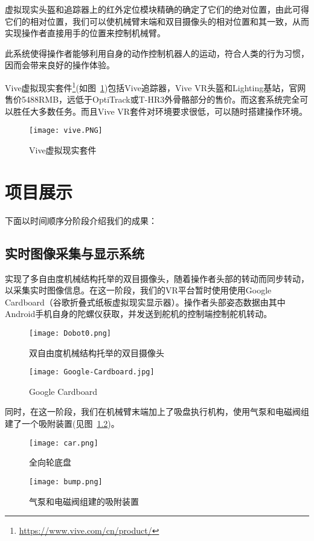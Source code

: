 虚拟现实头盔和追踪器上的红外定位模块精确的确定了它们的绝对位置，由此可得它们的相对位置，我们可以使机械臂末端和双目摄像头的相对位置和其一致，从而实现操作者直接用手的位置来控制机械臂。

此系统使得操作者能够利用自身的动作控制机器人的运动，符合人类的行为习惯，因而会带来良好的操作体验。

Vive虚拟现实套件\footnote{\url{https://www.vive.com/cn/product/}}(如图~\ref{vivekit})包括Vive追踪器，Vive VR头盔和Lighting基站，官网售价5488RMB，远低于OptiTrack或T-HR3外骨骼部分的售价。而这套系统完全可以胜任大多数任务。而且Vive VR套件对环境要求很低，可以随时搭建操作环境。
\begin{figure}[H]
\small
\centering
\texttt{[image: vive.PNG]}
\caption{Vive虚拟现实套件} 
\label{vivekit}
\end{figure}




\chapter{项目展示}
下面以时间顺序分阶段介绍我们的成果：

\section{实时图像采集与显示系统}
实现了多自由度机械结构托举的双目摄像头，随着操作者头部的转动而同步转动，以采集实时图像信息。在这一阶段，我们的VR平台暂时使用使用Google Cardboard（谷歌折叠式纸板虚拟现实显示器）。操作者头部姿态数据由其中Android手机自身的陀螺仪获取，并发送到舵机的控制端控制舵机转动。

\begin{figure}
\begin{minipage}{0.48\textwidth}
  \centering
  \texttt{[image: Dobot0.png]}
  \caption{双自由度机械结构托举的双目摄像头}
  \label{zed}
\end{minipage}\hfill
\begin{minipage}{0.48\textwidth}
  \centering
  \texttt{[image: Google-Cardboard.jpg]}
  \caption{Google Cardboard}
  \label{bump}
\end{minipage}
\end{figure}

同时，在这一阶段，我们在机械臂末端加上了吸盘执行机构，使用气泵和电磁阀组建了一个吸附装置(见图~\ref{bump})。

\begin{figure}
\begin{minipage}{0.48\textwidth}
  \centering
  \texttt{[image: car.png]}
  \caption{全向轮底盘}
  \label{car}
\end{minipage}\hfill
\begin{minipage}{0.48\textwidth}
  \centering
  \texttt{[image: bump.png]}
  \caption{气泵和电磁阀组建的吸附装置}
  \label{bump}
\end{minipage}
\end{figure}


